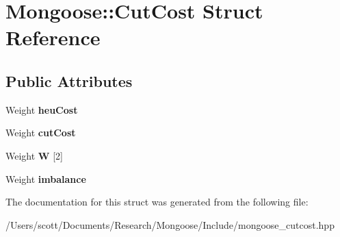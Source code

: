 \hypertarget{struct_mongoose_1_1_cut_cost}{}\section{Mongoose\+:\+:Cut\+Cost Struct Reference}
\label{struct_mongoose_1_1_cut_cost}
\subsection*{Public Attributes}
\begin{DoxyCompactItemize}
\item 
Weight {\bfseries heu\+Cost}\hypertarget{struct_mongoose_1_1_cut_cost_a8e77b912ee0a879e9db9c7f325ef7195}{}\label{struct_mongoose_1_1_cut_cost_a8e77b912ee0a879e9db9c7f325ef7195}

\item 
Weight {\bfseries cut\+Cost}\hypertarget{struct_mongoose_1_1_cut_cost_a2d232726628efbdd9f76f9dfa963066d}{}\label{struct_mongoose_1_1_cut_cost_a2d232726628efbdd9f76f9dfa963066d}

\item 
Weight {\bfseries W} \mbox{[}2\mbox{]}\hypertarget{struct_mongoose_1_1_cut_cost_ae2609bea3d7bbfc6fd28e038b3937f36}{}\label{struct_mongoose_1_1_cut_cost_ae2609bea3d7bbfc6fd28e038b3937f36}

\item 
Weight {\bfseries imbalance}\hypertarget{struct_mongoose_1_1_cut_cost_a70ddd2c12e1c220725e3b50f956be42d}{}\label{struct_mongoose_1_1_cut_cost_a70ddd2c12e1c220725e3b50f956be42d}

\end{DoxyCompactItemize}


The documentation for this struct was generated from the following file\+:\begin{DoxyCompactItemize}
\item 
/\+Users/scott/\+Documents/\+Research/\+Mongoose/\+Include/mongoose\+\_\+cutcost.\+hpp\end{DoxyCompactItemize}

